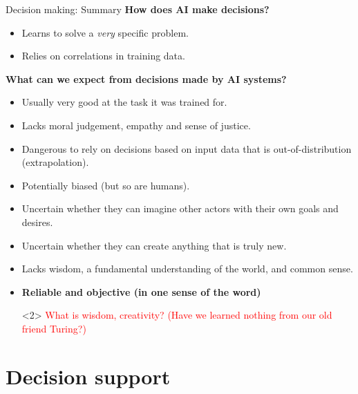 \documentclass[8pt]{beamer}
\begin{document}
	\begin{frame}[t]{Decision making: Summary}
		\textbf{How does AI make decisions?}
		\begin{itemize}
			\item Learns to solve a \textit{very} specific problem.
			\item Relies on correlations in training data.
		\end{itemize}
		\textbf{What can we expect from decisions made by AI systems?}
		\begin{itemize}
			\item Usually very good at the task it was trained for.
			\item Lacks moral judgement, empathy and sense of justice.
			\item Dangerous to rely on decisions based on input data that is out-of-distribution (extrapolation).
			\item Potentially biased (but so are humans).
			\item Uncertain whether they can imagine other actors with their own goals and desires.
			\item Uncertain whether they can create anything that is truly new.
			\item Lacks wisdom, a fundamental understanding of the world, and common sense.
			\item \textbf{Reliable and objective (in one sense of the word)}
			\item[\textcolor{red}{\rightarrow}] <2> \textcolor{red}{What is wisdom, creativity? (Have we learned nothing from our old friend Turing?)}
		\end{itemize}
	\end{frame}

	\section{Decision support}
\end{document}
